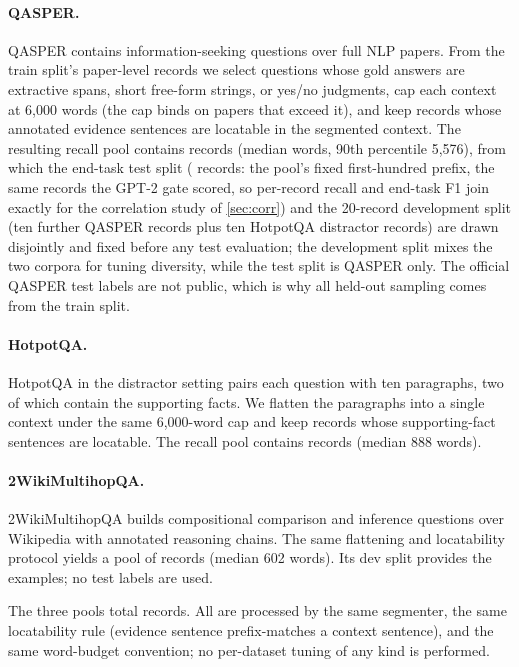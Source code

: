 \documentclass[pdflatex,sn-basic]{sn-jnl}
\theoremstyle{remark}
\begin{document}
\paragraph{QASPER.}
QASPER \citep{dasigi2021qasper} contains information-seeking questions
over full NLP papers. From the train split's paper-level records we
select questions whose gold answers are extractive spans, short
free-form strings, or yes/no judgments, cap each context at 6{,}000
words (the cap binds on papers that exceed it), and keep records whose
annotated evidence sentences are locatable in the segmented context.
The resulting recall pool contains \NRecQ{} records (median
\PoolQMedWords{} words, 90th percentile 5{,}576), from which the
end-task test split (\QAN{} records: the pool's fixed first-hundred
prefix, the same records the GPT-2 gate scored, so per-record recall
and end-task F1 join exactly for the correlation study of
\autoref{sec:corr}) and the 20-record development split (ten further
QASPER records plus ten HotpotQA distractor records) are drawn
disjointly and fixed before any test evaluation; the development split
mixes the two corpora for tuning diversity, while the test split is
QASPER only. The official QASPER test labels are not public, which is
why all held-out sampling comes from the train split.

\paragraph{HotpotQA.}
HotpotQA \citep{yang2018hotpotqa} in the distractor setting pairs each
question with ten paragraphs, two of which contain the supporting
facts. We flatten the paragraphs into a single context under the same
6{,}000-word cap and keep records whose supporting-fact sentences are
locatable. The recall pool contains \NRecH{} records (median 888
words).

\paragraph{2WikiMultihopQA.}
2WikiMultihopQA \citep{ho2020wiki} builds compositional comparison and
inference questions over Wikipedia with annotated reasoning chains.
The same flattening and locatability protocol yields a pool of
\NRecW{} records (median 602 words). Its dev split provides the
examples; no test labels are used.

The three pools total \TotalRecords{} records. All are processed by
the same segmenter, the same locatability rule (evidence sentence
prefix-matches a context sentence), and the same word-budget
convention; no per-dataset tuning of any kind is performed.
\end{document}
